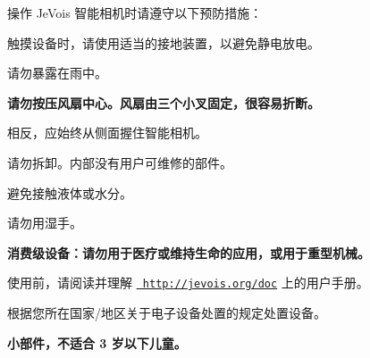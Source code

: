 操作 Je\+Vois 智能相机时请遵守以下预防措施：




\begin{DoxyItemize}
\item 触摸设备时，请使用适当的接地装置，以避免静电放电。
\item 请勿暴露在雨中。
\item {\bfseries{请勿按压风扇中心。风扇由三个小叉固定，很容易折断。}}
\item 相反，应始终从侧面握住智能相机。
\item 请勿拆卸。内部没有用户可维修的部件。
\item 避免接触液体或水分。
\item 请勿用湿手。
\item {\bfseries{消费级设备：请勿用于医疗或维持生命的应用，或用于重型机械。}}
\item 使用前，请阅读并理解 \href{http://jevois.org/doc}{\texttt{ http\+://jevois.\+org/doc}} 上的用户手册。
\item 根据您所在国家/地区关于电子设备处置的规定处置设备。
\item {\bfseries{小部件，不适合 3 岁以下儿童。}} 
\end{DoxyItemize}